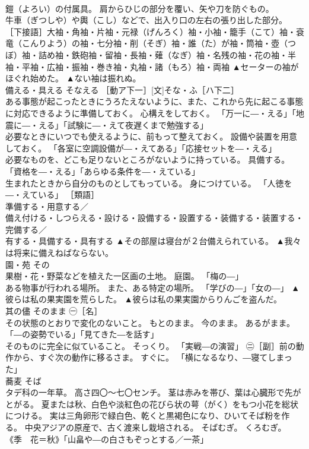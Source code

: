 \documentclass[8pt]{extreport}
\begin{document}
\begin{CJK}{UTF8}{min}
\\	鎧（よろい）の付属具。 肩からひじの部分を覆い、矢や刀を防ぐもの。 
\\	牛車（ぎつしや）や輿（こし）などで、出入り口の左右の張り出した部分。 ［下接語］大袖・角袖・片袖・元禄（げんろく）袖・小袖・籠手（こて）袖・袞竜（こんりよう）の袖・七分袖・削（そぎ）袖・誰（た）が袖・筒袖・壺（つぼ）袖・詰め袖・鉄砲袖・留袖・長袖・薙（なぎ）袖・名残の袖・花の袖・半袖・平袖・広袖・振袖・巻き袖・丸袖・諸（もろ）袖・両袖	▲セーターの袖がほぐれ始めた。 ▲ない袖は振れぬ。
\\	備える・具える	そなえる	［動ア下一］[文]そな・ふ［ハ下二］ 
\\	ある事態が起こったときにうろたえないように、また、これから先に起こる事態に対応できるように準備しておく。 心構えをしておく。 「万一に―・える」「地震に―・える」「試験に―・えて夜遅くまで勉強する」 
\\	必要なときにいつでも使えるように、前もって整えておく。 設備や装置を用意しておく。 「各室に空調設備が―・えてある」「応接セットを―・える」 
\\	必要なものを、どこも足りないところがないように持っている。 具備する。 「資格を―・える」「あらゆる条件を―・えている」 
\\	生まれたときから自分のものとしてもっている。 身につけている。 「人徳を―・えている」 ［類語］
\\	準備する・用意する／
\\	備え付ける・しつらえる・設ける・設備する・設置する・装備する・装置する・完備する／
\\	有する・具備する・具有する	▲その部屋は寝台が２台備えられている。 ▲我々は将来に備えねばならない。
\\	園・苑	その	
\\	果樹・花・野菜などを植えた一区画の土地。 庭園。 「梅の―」 
\\	ある物事が行われる場所。 また、ある特定の場所。 「学びの―」「女の―」	▲彼らは私の果実園を荒らした。 ▲彼らは私の果実園からりんごを盗んだ。
\\	其の儘	そのまま	㊀［名］ 
\\	その状態のとおりで変化のないこと。 もとのまま。 今のまま。 あるがまま。 「―の姿勢でいる」「見てきた―を話す」 
\\	そのものに完全に似ていること。 そっくり。 「実戦―の演習」 ㊁［副］前の動作から、すぐ次の動作に移るさま。 すぐに。 「横になるなり、―寝てしまった」	
\\	蕎麦	そば	
\\	タデ科の一年草。 高さ四〇〜七〇センチ。 茎は赤みを帯び、葉は心臓形で先がとがる。 夏または秋、白色や淡紅色の花びら状の萼（がく）をもつ小花を総状につける。 実は三角卵形で緑白色、乾くと黒褐色になり、ひいてそば粉を作る。 中央アジアの原産で、古く渡来し栽培される。 そばむぎ。 くろむぎ。 《季　花＝秋》「山畠や―の白さもぞっとする／一茶」 

\end{CJK}
\end{document}
